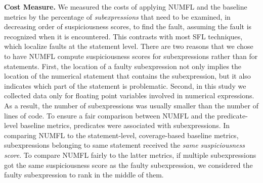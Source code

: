 {\bf Cost Measure.}  We measured the costs of applying NUMFL and the baseline metrics by the percentage of {\it subexpressions} that need to be examined, in decreasing order of suspiciousness scores, to find the fault, assuming the fault is recognized when it is encountered.  This contrasts with most SFL techniques, which localize faults at the statement level.  There are two reasons that we chose to have NUMFL compute suspiciousness scores for subexpressions rather than for statements.  First, the location of a faulty subexpression not only implies the location of the numerical statement that contains the subexpression, but it also indicates which part of the statement is problematic.   Second, in this study we collected data only for floating point variables involved in numerical expressions.   As a result, the number of subexpressions was usually smaller than the number of lines of code.  To ensure a fair comparison between NUMFL and the predicate-level baseline metrics, predicates were associated with subexpressions.  In comparing NUMFL to the statement-level, coverage-based baseline metrics, subexpressions belonging to same statement received the {\it same suspiciousness score}.   To compare NUMFL fairly to the latter metrics, if multiple subexpressions got the same suspiciousness score as the faulty subexpression, we considered the faulty subexpression to rank in the middle of them.

